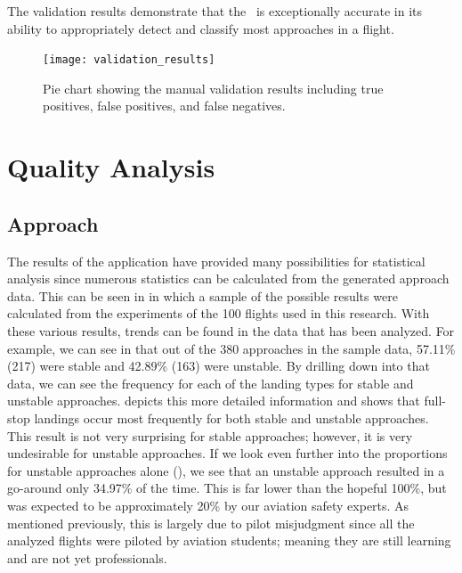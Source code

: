         The validation results demonstrate that the \toolname\ is exceptionally accurate in its ability to appropriately detect and classify most approaches in a flight.

        \begin{figure}
            \centering
            \texttt{[image: validation\_results]}
            \caption{Pie chart showing the manual validation results including true positives, false positives, and false negatives.}
            \label{fig:validation_results}
        \end{figure}
    
    
\section{Quality Analysis}


    \subsection{Approach}
    
    	The results of the application have provided many possibilities for statistical analysis since numerous statistics can be calculated from the generated approach data.  This can be seen in  in which a sample of the possible results were calculated from the experiments of the 100 flights used in this research.  With these various results, trends can be found in the data that has been analyzed.  For example, we can see in  that out of the 380 approaches in the sample data, 57.11\% (217) were stable and 42.89\% (163) were unstable.  By drilling down into that data, we can see the frequency for each of the landing types for stable and unstable approaches.   depicts this more detailed information and shows that full-stop landings occur most frequently for both stable and unstable approaches.  This result is not very surprising for stable approaches; however, it is very undesirable for unstable approaches.  If we look even further into the proportions for unstable approaches alone (), we see that an unstable approach resulted in a go-around only 34.97\% of the time.  This is far lower than the hopeful 100\%, but was expected to be approximately 20\% by our aviation safety experts.  As mentioned previously, this is largely due to pilot misjudgment since all the analyzed flights were piloted by aviation students; meaning they are still learning and are not yet professionals.
    
